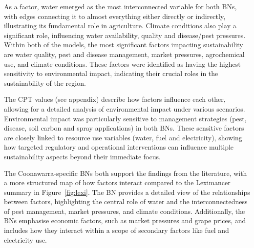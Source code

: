 \documentclass[fleqn,10pt]{wlscirep}
\begin{document}
As a factor, water emerged as the most interconnected variable for both BNs, with edges connecting it to almost everything either directly or indirectly, illustrating its fundamental role in agriculture. Climate conditions also play a significant role, influencing water availability, quality and disease/pest pressures. Within both of the models, the most significant factors impacting sustainability are water quality, pest and disease management, market pressures, agrochemical use, and climate conditions. These factors were identified as having the highest sensitivity to environmental impact, indicating their crucial roles in the sustainability of the region.

The CPT values (see appendix) describe how factors influence each other, allowing for a detailed analysis of environmental impact under various scenarios. Environmental impact was particularly sensitive to management strategies (pest, disease, soil carbon and spray applications) in both BNs. These sensitive factors are closely linked to resource use variables (water, fuel and electricity), showing how targeted regulatory and operational interventions can influence multiple sustainability aspects beyond their immediate focus. 

The Coonawarra-specific BNs both support the findings from the literature, with a more structured map of how factors interact compared to the Leximancer summary in Figure~\ref{fig:lexi}. The BN provides a detailed view of the relationships between factors, highlighting the central role of water and the interconnectedness of pest management, market pressures, and climate conditions. Additionally, the BNs emphasise economic factors, such as market pressures and grape prices, and includes how they interact within a scope of secondary factors like fuel and electricity use.


\end{document}
